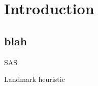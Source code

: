 \section{Introduction}
  \subsection*{blah}

\begin{frame}
  \begin{block}
    \item SAS\superscript{+}
    \item Landmark heuristic
  \end{block}
\end{frame}

